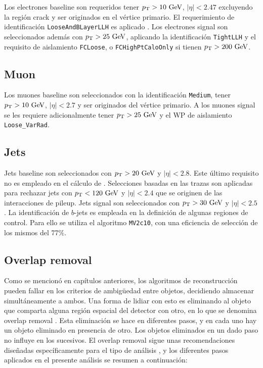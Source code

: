 Los electrones baseline son requeridos tener $\pt>10\ \gev$, $|\eta|<2.47$ excluyendo la región crack y ser originados en el vértice primario. El requerimiento de identificación \texttt{LooseAndBLayerLLH} es aplicado . Los electrones signal son seleccionados además con $\pt>25\ \gev$, aplicando la identificación \texttt{TightLLH} y el requisito de aislamiento \texttt{FCLoose}, o \texttt{FCHighPtCaloOnly} si tienen $p_{\text{T}}>200\ \text{GeV}$.


\subsection{Muon}

Los muones baseline son seleccionados con la identificación \texttt{Medium}, tener $\pt>10\ \gev$, $|\eta|<2.7$ y ser originados del vértice primario. A los muones signal se les requiere adicionalmente tener $\pt>25\ \gev$ y el WP de aislamiento \texttt{Loose\_VarRad}.


\subsection{Jets}

Jets baseline son seleccionados con $p_{\text{T}}>20\ \text{GeV}$ y $|\eta|<2.8$. Este último requisito no es empleado en el cálculo de \met. Selecciones basadas en las trazas son aplicadas para rechazar jets con $p_{\text{T}}<120\ \text{GeV}$ y $|\eta|<2.4$ que se originen de las interacciones de pileup. Jets signal son seleccionados con $p_{\text{T}}>30\ \text{GeV}$ y $|\eta|<2.5$. La identificación de $b$-jets es empleada en la definición de algunas regiones de control. Para ello se utiliza el algoritmo \texttt{MV2c10}, con una eficiencia de selección de los mismos del 77\%.

\subsection{Overlap removal}

Como se mencionó en capítulos anteriores, los algoritmos de reconstrucción pueden fallar en los criterios de ambigüedad entre objetos, decidiendo almacenar simultáneamente a ambos. Una forma de lidiar con esto es eliminando al objeto que comparta alguna región espacial del detector con otro, en lo que se denomina overlap removal \cite{Adams:1743654}. Esta eliminación se hace en diferentes pasos, y en cada uno hay un objeto eliminado en presencia de otro. Los objetos eliminados en un dado paso no influye en los sucesivos.
El overlap removal sigue unas recomendaciones diseñadas específicamente para el tipo de análisis \cite{ATL-COM-PHYS-2016-1518}, y los diferentes pasos aplicados en el presente análisis se resumen a continuación: 

